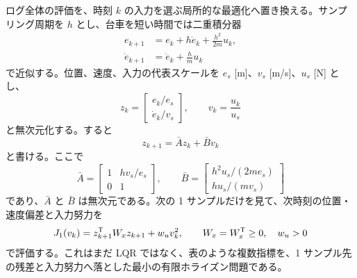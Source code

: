 ログ全体の評価を、時刻 $k$ の入力を選ぶ局所的な最適化へ置き換える。サンプリング周期を $h$ とし、台車を短い時間では二重積分器
\begin{align}
  e_{k+1}&=e_k+h\dot{e}_k+\frac{h^2}{2m}u_k,\\
  \dot{e}_{k+1}&=\dot{e}_k+\frac{h}{m}u_k
  \label{eq:cart-double-integrator-step}
\end{align}
で近似する。位置、速度、入力の代表スケールを $e_s$ [m]、$v_s$ [m/s]、$u_s$ [N] とし、
\begin{equation}
  z_k=
  \begin{bmatrix}
    e_k/e_s\\
    \dot{e}_k/v_s
  \end{bmatrix},
  \qquad
  v_k=\frac{u_k}{u_s}
\end{equation}
と無次元化する。すると
\begin{equation}
  z_{k+1}=\bar{A}z_k+\bar{B}v_k
\end{equation}
と書ける。ここで
\begin{equation}
  \bar{A}=
  \begin{bmatrix}
    1 & hv_s/e_s\\
    0 & 1
  \end{bmatrix},
  \qquad
  \bar{B}=
  \begin{bmatrix}
    h^2u_s/(2me_s)\\
    hu_s/(mv_s)
  \end{bmatrix}
\end{equation}
であり、$\bar{A}$ と $\bar{B}$ は無次元である。次の 1 サンプルだけを見て、次時刻の位置・速度偏差と入力努力を
\begin{equation}
  J_1(v_k)
  =
  z_{k+1}^{\mathsf{T}} W_x z_{k+1}
  +w_u v_k^2,
  \qquad
  W_x=W_x^{\mathsf{T}}\ge0,\quad w_u>0
  \label{eq:one-step-cost}
\end{equation}
で評価する。これはまだ LQR ではなく、表のような複数指標を、1 サンプル先の残差と入力努力へ落とした最小の有限ホライズン問題である。

